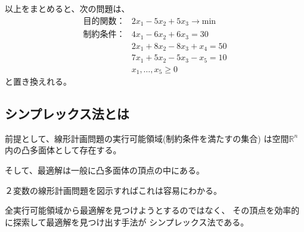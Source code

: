 \documentclass[9pt]{ltjsreport}
\begin{document}
以上をまとめると、次の問題は、
\begin{align*}
    \text{目的関数：}&2x_1-5x_2+5x_3\longrightarrow\mathrm{min}\\
    \text{制約条件：}&4x_1-6x_2+6x_3=30\\
                   &2x_1+8x_2-8x_3+x_4=50\\
                   &7x_1+5x_2-5x_3-x_5=10\\
                   &x_1,\dots,x_5\ge0
\end{align*}
と置き換えれる。

\newpage
\subsection{シンプレックス法とは}
前提として、線形計画問題の実行可能領域(制約条件を満たすの集合)
は空間$\mathbb{R}^n$内の凸多面体として存在する。

そして、最適解は一般に凸多面体の頂点の中にある。

２変数の線形計画問題を図示すればこれは容易にわかる。

全実行可能領域から最適解を見つけようとするのではなく、
その頂点を効率的に探索して最適解を見つけ出す手法が
シンプレックス法である。
\end{document}
